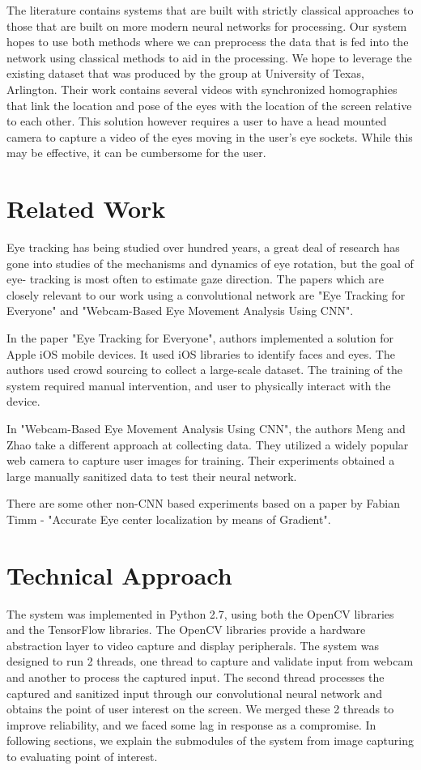 \documentclass[10pt,twocolumn,letterpaper]{article}
\begin{document}
The literature contains systems that are built with strictly classical
approaches to those that are built on more modern neural networks for
processing\cite{krafka}\cite{mcmurrough}\cite{weidenbacher}\cite{baluja}\cite{cazzato}\cite{li}. Our
system hopes to use both methods where we can preprocess the data that
is fed into the network using classical methods to aid in the
processing. We hope to leverage the existing dataset that was produced
by the group at University of Texas, Arlington\cite{mcmurrough}. Their
work contains several videos with synchronized homographies that link
the location and pose of the eyes with the location of the screen
relative to each other. This solution however requires a user to have
a head mounted camera to capture a video of the eyes moving in the
user's eye sockets. While this may be effective, it can be cumbersome
for the user.


\section{Related Work}
Eye tracking has being studied over hundred years, a great deal of
research has gone into studies of the mechanisms and dynamics of eye
rotation, but the goal of eye- tracking is most often to estimate gaze
direction.  The papers which are closely relevant to our work using a
convolutional network are "Eye Tracking for Everyone"\cite{krafka} and "Webcam-Based Eye Movement Analysis Using CNN"\cite{zhaomeng}.

In the paper "Eye Tracking for Everyone", authors implemented a
solution for Apple iOS mobile devices. It used iOS libraries to
identify faces and eyes. The authors used crowd sourcing to collect a large-scale dataset. The training of the system required manual intervention, and user to physically interact with the device. 

In "Webcam-Based Eye Movement Analysis Using CNN", the authors Meng
and Zhao take a different approach at collecting data. They utilized a
widely popular web camera to capture user images for training. Their experiments obtained a large manually sanitized data to test their neural network. 

There are some other non-CNN based experiments based on a paper by Fabian Timm - "Accurate Eye center localization by means of Gradient". 

\section{Technical Approach}
The system was implemented in Python 2.7, using both the OpenCV
libraries and the TensorFlow libraries. The OpenCV libraries provide a
hardware abstraction layer to video capture and display
peripherals. The system was designed to run 2 threads, one thread to
capture and validate input from webcam and another to process the
captured input. The second thread processes the captured and
sanitized input through our convolutional neural network and obtains
the point of user interest on the screen. We merged these 2 threads to
improve reliability, and we faced some lag in response as a compromise. In
following sections, we explain the submodules of the system from image
capturing to evaluating point of interest.
\end{document}
